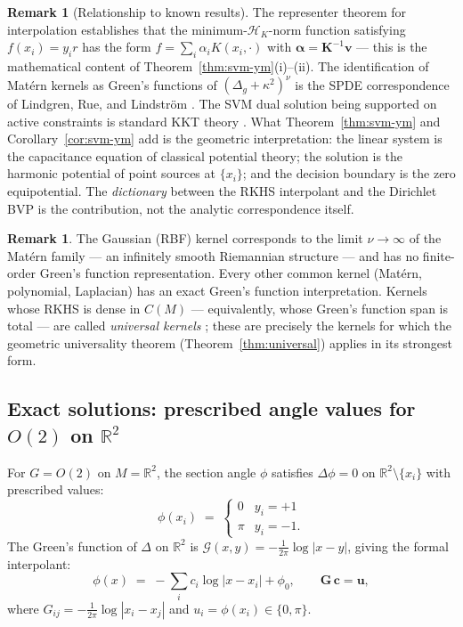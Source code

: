 \documentclass[11pt, a4paper]{article}
\theoremstyle{plain}
\theoremstyle{definition}
\newtheorem{remark}[theorem]{Remark}
\newcommand{\R}{\mathbb{R}}
\newcommand{\Gr}{\mathcal{G}}   %
\begin{document}
\begin{remark}[Relationship to known results]\label{rem:known}
The representer theorem for interpolation \cite{kimeldorf1971some} establishes
that the minimum-$\mathcal{H}_K$-norm function satisfying $f(x_i) = y_i r$ has
the form $f = \sum_i \alpha_i K(x_i,\cdot)$ with $\boldsymbol{\alpha} =
\mathbf{K}^{-1}\mathbf{v}$ --- this is the mathematical content of
Theorem~\ref{thm:svm-ym}(i)--(ii). The identification of Mat\'ern kernels as
Green's functions of $(\Delta_g+\kappa^2)^\nu$ is the SPDE correspondence of
Lindgren, Rue, and Lindstr\"om \cite{lindgren2011spde}. The SVM dual solution
being supported on active constraints is standard KKT theory \cite{scholkopf2002}.
What Theorem~\ref{thm:svm-ym} and Corollary~\ref{cor:svm-ym} add is the
geometric interpretation: the linear system is the capacitance equation of
classical potential theory; the solution is the harmonic potential of point
sources at $\{x_i\}$; and the decision boundary is the zero equipotential.
The \emph{dictionary} between the RKHS interpolant and the Dirichlet BVP is the
contribution, not the analytic correspondence itself.
\end{remark}

\begin{remark}
The Gaussian (RBF) kernel corresponds to the limit $\nu\to\infty$ of the Mat\'ern
family --- an infinitely smooth Riemannian structure --- and has no finite-order
Green's function representation. Every other common kernel (Mat\'ern, polynomial,
Laplacian) has an exact Green's function interpretation. Kernels whose RKHS is
dense in $C(M)$ --- equivalently, whose Green's function span is total --- are
called \emph{universal kernels} \cite{steinwart2001}; these are precisely the
kernels for which the geometric universality theorem (Theorem~\ref{thm:universal})
applies in its strongest form.
\end{remark}

\subsection{Exact solutions: prescribed angle values for $O(2)$ on $\R^2$}
\label{subsec:O2}

For $G = O(2)$ on $M = \R^2$, the section angle $\phi$ satisfies
$\Delta\phi = 0$ on $\R^2\setminus\{x_i\}$ with prescribed values:
\[
  \phi(x_i) \;=\; \begin{cases} 0 & y_i = +1 \\ \pi & y_i = -1. \end{cases}
\]
The Green's function of $\Delta$ on $\R^2$ is $\Gr(x,y) = -\frac{1}{2\pi}\log|x-y|$,
giving the formal interpolant:
\begin{equation}\label{eq:phi-harmonic}
  \phi(x) \;=\; -\sum_i c_i\log|x - x_i| + \phi_0,
  \qquad \mathbf{G}\,\mathbf{c} = \mathbf{u},
\end{equation}
where $G_{ij} = -\frac{1}{2\pi}\log|x_i-x_j|$ and
$u_i = \phi(x_i) \in \{0,\pi\}$.
\end{document}
